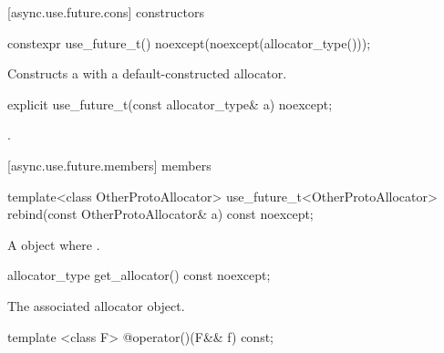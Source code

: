 [async.use.future.cons]{ constructors}

%
\begin{itemdecl}
constexpr use_future_t() noexcept(noexcept(allocator_type()));
\end{itemdecl}

\begin{itemdescr}
\pnum
\effects Constructs a  with a default-constructed allocator.
\end{itemdescr}

\begin{itemdecl}
explicit use_future_t(const allocator_type& a) noexcept;
\end{itemdecl}

\begin{itemdescr}
\pnum
\postconditions {}.
\end{itemdescr}



[async.use.future.members]{ members}

%
\begin{itemdecl}
template<class OtherProtoAllocator> use_future_t<OtherProtoAllocator>
  rebind(const OtherProtoAllocator& a) const noexcept;
\end{itemdecl}

\begin{itemdescr}
\pnum
\returns A  object where .
\end{itemdescr}

%
\begin{itemdecl}
allocator_type get_allocator() const noexcept;
\end{itemdecl}

\begin{itemdescr}
\pnum
\returns The associated allocator object.
\end{itemdescr}

%
\begin{itemdecl}
template <class F> @\unspec@ operator()(F&& f) const;
\end{itemdecl}

